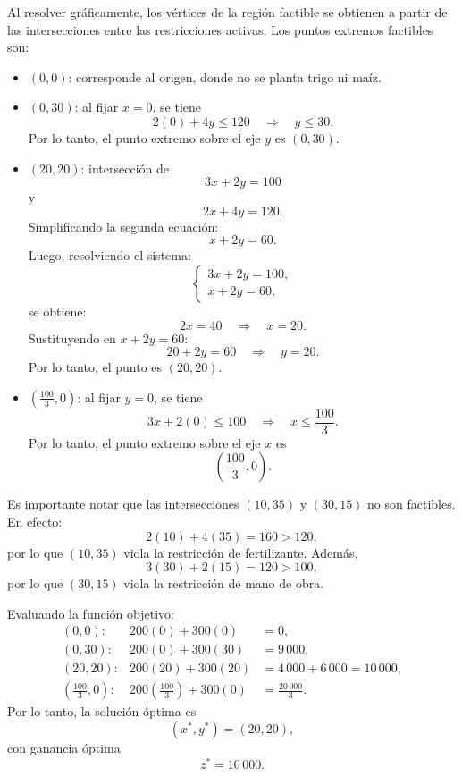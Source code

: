 Al resolver gráficamente, los vértices de la región factible se obtienen a partir de las intersecciones entre las restricciones activas. Los puntos extremos factibles son:
\begin{itemize}
    \item \((0,0)\): corresponde al origen, donde no se planta trigo ni maíz.

    \item \((0,30)\): al fijar \(x=0\), se tiene
    \[
    2(0)+4y\le 120 \quad \Rightarrow \quad y\le 30.
    \]
    Por lo tanto, el punto extremo sobre el eje \(y\) es \((0,30)\).

    \item \((20,20)\): intersección de
    \[
    3x+2y=100
    \]
    y
    \[
    2x+4y=120.
    \]
    Simplificando la segunda ecuación:
    \[
    x+2y=60.
    \]
    Luego, resolviendo el sistema:
    \[
    \begin{cases}
    3x+2y=100,\\
    x+2y=60,
    \end{cases}
    \]
    se obtiene:
    \[
    2x=40 \quad \Rightarrow \quad x=20.
    \]
    Sustituyendo en \(x+2y=60\):
    \[
    20+2y=60 \quad \Rightarrow \quad y=20.
    \]
    Por lo tanto, el punto es \((20,20)\).

    \item \(\left(\frac{100}{3},0\right)\): al fijar \(y=0\), se tiene
    \[
    3x+2(0)\le 100 \quad \Rightarrow \quad x\le \frac{100}{3}.
    \]
    Por lo tanto, el punto extremo sobre el eje \(x\) es
    \[
    \left(\frac{100}{3},0\right).
    \]
\end{itemize}

Es importante notar que las intersecciones \((10,35)\) y \((30,15)\) no son factibles. En efecto:
\[
2(10)+4(35)=160>120,
\]
por lo que \((10,35)\) viola la restricción de fertilizante. Además,
\[
3(30)+2(15)=120>100,
\]
por lo que \((30,15)\) viola la restricción de mano de obra.

Evaluando la función objetivo:
\[
\begin{array}{rcl}
(0,0): & 200(0)+300(0) &= 0,\\[1mm]
(0,30): & 200(0)+300(30) &= 9\,000,\\[1mm]
(20,20): & 200(20)+300(20) &= 4\,000+6\,000=10\,000,\\[1mm]
\left(\frac{100}{3},0\right): 
& 200\left(\frac{100}{3}\right)+300(0) 
&= \frac{20\,000}{3}.
\end{array}
\]
Por lo tanto, la solución óptima es
\[
(x^*,y^*)=(20,20),
\]
con ganancia óptima
\[
z^*=10\,000.
\]

